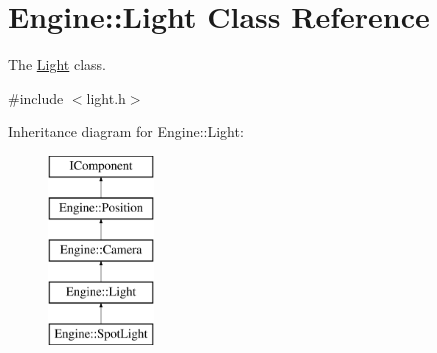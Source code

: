 \hypertarget{classEngine_1_1Light}{}\section{Engine\+:\+:Light Class Reference}
\label{classEngine_1_1Light}


The \hyperlink{classEngine_1_1Light}{Light} class.  




{\ttfamily \#include $<$light.\+h$>$}

Inheritance diagram for Engine\+:\+:Light\+:\begin{figure}[H]
\begin{center}
\leavevmode
\includegraphics[height=5.000000cm]{classEngine_1_1Light}
\end{center}
\end{figure}
